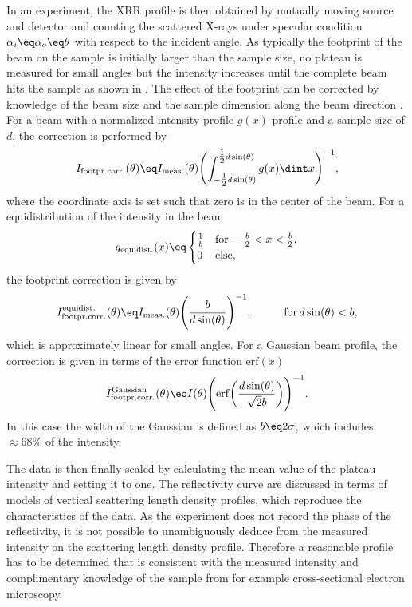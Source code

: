 \documentclass[\main/dresen_thesis.tex]{subfiles}
\begin{document}
    In an experiment, the XRR profile is then obtained by mutually moving source and detector and counting the scattered X-rays under specular condition $\alpha_i \eq \alpha_o \eq \theta$ with respect to the incident angle.
    As typically the footprint of the beam on the sample is initially larger than the sample size, no plateau is measured for small angles but the intensity increases until the complete beam hits the sample as shown in .
    The effect of the footprint can be corrected by knowledge of the beam size and the sample dimension along the beam direction \cite{Gibaud_1993_Theco}.
    For a beam with a normalized intensity profile $g(x)$ profile and a sample size of $d$, the correction is performed by
    \begin{align}
      I_\mathrm{footpr. corr.}(\theta) \eq I_\mathrm{meas.}(\theta) \Biggl( \int_{-\tfrac{1}{2}d \sin(\theta)}^{\tfrac{1}{2}d \sin(\theta)} g(x) \dint x \Biggr)^{-1},
    \end{align}
    where the coordinate axis is set such that zero is in the center of the beam.
    For a equidistribution of the intensity in the beam
    \begin{align}
      g_\mathrm{equidist.}(x) \eq \begin{cases}
        \frac{1}{b}& \mathrm{for\,}-\frac{b}{2} < x < \frac{b}{2},\\
        0&\mathrm{else},
      \end{cases}
    \end{align}
    the footprint correction is given by
    \begin{align}
      I_\mathrm{footpr. corr.}^\mathrm{equidist.}(\theta) \eq I_\mathrm{meas.}(\theta) \Biggl( \frac{b}{d \sin(\theta)}\Biggr)^{-1},\hspace{1cm}\mathrm{for\,}d\sin(\theta)<b ,
    \end{align}
    which is approximately linear for small angles.
    For a Gaussian beam profile, the correction is given in terms of the error function $\mathrm{erf}(x)$
    \begin{align}
      I_\mathrm{footpr. corr.}^\mathrm{Gaussian}(\theta) \eq I(\theta) \Biggl( \mathrm{erf}\biggl( \frac{d \sin(\theta)}{\sqrt{2}b} \biggr) \Biggr)^{-1}.
    \end{align}
    In this case the width of the Gaussian is defined as $b \eq 2 \sigma$, which includes $\approx 68 \%$ of the intensity.

    The data is then finally scaled by calculating the mean value of the plateau intensity and setting it to one.
    The reflectivity curve are discussed in terms of models of vertical scattering length density profiles, which reproduce the characteristics of the data.
    As the experiment does not record the phase of the reflectivity, it is not possible to unambiguously deduce from the measured intensity on the scattering length density profile.
    Therefore a reasonable profile has to be determined that is consistent with the measured intensity and complimentary knowledge of the sample from for example cross-sectional electron microscopy.
\end{document}
